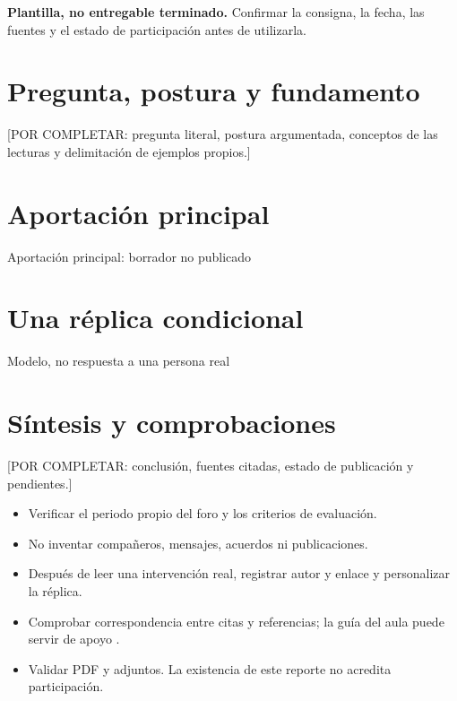 


\noindent\textbf{Plantilla, no entregable terminado.} Confirmar la consigna, la fecha, las fuentes y el estado de participación antes de utilizarla.

\section{Pregunta, postura y fundamento}
[POR COMPLETAR: pregunta literal, postura argumentada, conceptos de las lecturas y delimitación de ejemplos propios.]

\section{Aportación principal}
\begin{forobox}{Aportación principal: borrador no publicado}
\end{forobox}

\section{Una réplica condicional}
\begin{forobox}{Modelo, no respuesta a una persona real}
\end{forobox}

\section{Síntesis y comprobaciones}
[POR COMPLETAR: conclusión, fuentes citadas, estado de publicación y pendientes.]

\begin{itemize}
  \item Verificar el periodo propio del foro y los criterios de evaluación.
  \item No inventar compañeros, mensajes, acuerdos ni publicaciones.
  \item Después de leer una intervención real, registrar autor y enlace y personalizar la réplica.
  \item Comprobar correspondencia entre citas y referencias; la guía del aula puede servir de apoyo \parencite{guiaapa}.
  \item Validar PDF y adjuntos. La existencia de este reporte no acredita participación.
\end{itemize}

